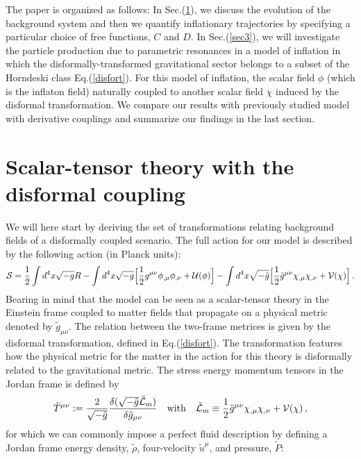 \documentclass[aps,prd,amsmath,amssymb,preprintnumbers,onecolumn,11pt,nofootinbib]{revtex4}
\begin{document}
The paper is organized as follows: In Sec.(\ref{s2}), we discuss the evolution of the background system and then we quantify inflationary trajectories by specifying a particular choice of free functions, $C$ and $D$. In Sec.(\ref{sec3}), we will investigate the particle production due to parametric resonances in a model of inflation in which the disformally-transformed gravitational sector belongs to a subset of the Horndeski class Eq.(\ref{disfort}). For this model of inflation, the scalar field $\phi$ (which is the inflaton field) naturally coupled to another scalar field $\chi$ induced by the disformal transformation. We compare our results with previously studied model with derivative couplings and summarize our findings in the last section. 

\section{Scalar-tensor theory with the disformal coupling}
\label{s2}
We will here start by deriving the set of transformations relating background fields of a disformally coupled scenario. The full action for our model is described by the following action (in Planck units):
\begin{eqnarray} \label{genaction}
{\cal S} = \frac{1}{2}\int d^{4}x\sqrt{-g}R - \int d^{4}x\sqrt{-g}\Big[\frac{1}{2}g^{\mu\nu}\phi_{,\mu}\phi_{,\nu} + {\cal U}(\phi)\Big] - \int d^{4}x\sqrt{-{\tilde g}}\Big[\frac{1}{2}{\tilde g}^{\mu\nu}\chi_{,\mu}\chi_{,\nu} + {\cal V}(\chi)\Big]\,.
\end{eqnarray}
Bearing in mind that the model can be seen as a scalar-tensor theory in the Einstein frame coupled to matter fields that propagate on a physical metric denoted by ${\tilde g}_{\mu\nu}$. The relation between the two-frame metrices is given by the disformal transformation, defined in Eq.(\ref{disfort}). The transformation features how the physical metric for the matter in the action for this theory is disformally related to the gravitational metric. The stress energy momentum tensors in the Jordan frame is defined by
\begin{eqnarray} \label{JF}
{\tilde T}^{\mu\nu} := \frac{2}{\sqrt{-\tilde{g}}}\frac{\delta(\sqrt{-\tilde{g}}{\tilde {\cal L}}_{\rm m})}{\delta {\tilde g}_{\mu\nu}}\quad{\rm with}\quad{\tilde {\cal L}}_{\rm m} \equiv \frac{1}{2}{\tilde g}^{\mu\nu}\chi_{,\mu}\chi_{,\nu} + {\cal V}(\chi)\,,
\end{eqnarray}
for which we can commonly impose a perfect fluid description by defining a Jordan frame energy density, ${\tilde \rho}$, four-velocity ${\tilde u}^{\mu}$, and pressure, ${\tilde P}$:
\end{document}
